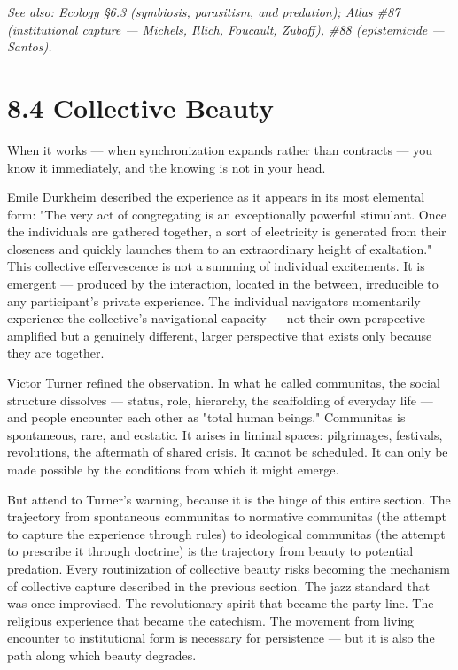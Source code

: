 \textit{See also: Ecology §6.3 (symbiosis, parasitism, and predation); Atlas \#87 (institutional capture — Michels, Illich, Foucault, Zuboff), \#88 (epistemicide — Santos).}


\bigskip\noindent\makebox[\textwidth]{\color{rulegray}\rule{5cm}{0.3pt}}\bigskip


\section*{8.4 Collective Beauty}


When it works — when synchronization expands rather than contracts — you know it immediately, and the knowing is not in your head.


Emile Durkheim described the experience as it appears in its most elemental form: "The very act of congregating is an exceptionally powerful stimulant. Once the individuals are gathered together, a sort of electricity is generated from their closeness and quickly launches them to an extraordinary height of exaltation." This collective effervescence is not a summing of individual excitements. It is emergent — produced by the interaction, located in the between, irreducible to any participant's private experience. The individual navigators momentarily experience the collective's navigational capacity — not their own perspective amplified but a genuinely different, larger perspective that exists only because they are together.


Victor Turner refined the observation. In what he called communitas, the social structure dissolves — status, role, hierarchy, the scaffolding of everyday life — and people encounter each other as "total human beings." Communitas is spontaneous, rare, and ecstatic. It arises in liminal spaces: pilgrimages, festivals, revolutions, the aftermath of shared crisis. It cannot be scheduled. It can only be made possible by the conditions from which it might emerge.


But attend to Turner's warning, because it is the hinge of this entire section. The trajectory from spontaneous communitas to normative communitas (the attempt to capture the experience through rules) to ideological communitas (the attempt to prescribe it through doctrine) is the trajectory from beauty to potential predation. Every routinization of collective beauty risks becoming the mechanism of collective capture described in the previous section. The jazz standard that was once improvised. The revolutionary spirit that became the party line. The religious experience that became the catechism. The movement from living encounter to institutional form is necessary for persistence — but it is also the path along which beauty degrades.


